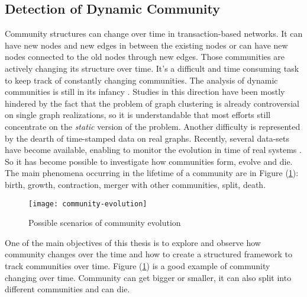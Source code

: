 \subsection{Detection of Dynamic Community}\label{subsub:dynamic_community}
Community structures can change over time in transaction-based networks. It can have new nodes and new edges in between the existing nodes or can have new nodes connected to the old nodes through new edges. Those communities are actively changing its structure over time. It's a difficult and time consuming task to keep track of constantly changing communities. The analysis of dynamic communities is still in its infancy \cite{ref-6}. Studies in this direction have been mostly hindered by the fact that the problem of graph clustering is already controversial on single graph realizations, so it is understandable that most efforts still concentrate on the \textit{static} version of the problem. Another difficulty is represented by the dearth of time-stamped data on real graphs. Recently, several data-sets have become available, enabling to monitor the evolution in time of real systems \cite{ref-23}. So it has become possible to investigate how communities form, evolve and die. The main phenomena occurring in the lifetime of a community are in Figure (\ref{fig:community_evolution}): birth, growth, contraction, merger with other communities, split, death.

\vfill
\pagebreak

\begin{figure}[!ht]
	\centering
	\texttt{[image: community-evolution]}
	\caption{Possible scenarios of community evolution \cite{ref-23}}
	\label{fig:community_evolution}
\end{figure}

One of the main objectives of this thesis is to explore and observe how community changes over the time and how to create a structured framework to track communities over time. Figure (\ref{fig:community_evolution}) is a good example of community changing over time. Community can get bigger or smaller, it can also split into different communities and can die.